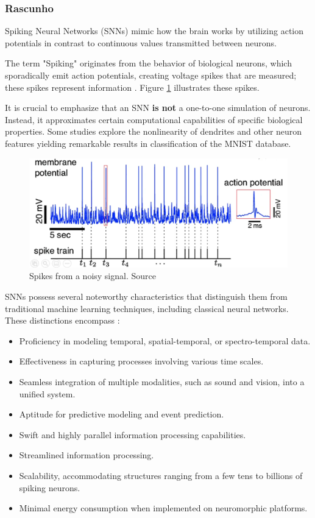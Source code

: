 \begin{frame}[allowframebreaks]
	\frametitle{Rascunho}
	\par Spiking Neural Networks (SNNs) mimic how the brain works by utilizing action potentials in contrast to continuous values transmitted between neurons.
	
	\par The term "Spiking" originates from the behavior of biological neurons, which sporadically emit action potentials, creating voltage spikes that are measured; these spikes represent information \cite{kasabov2019time}. Figure \ref{fig:neuronspikes} illustrates these spikes.
	
	\par It is crucial to emphasize that an SNN \textbf{is not} a one-to-one simulation of neurons. Instead, it approximates certain computational capabilities of specific biological properties. Some studies explore the nonlinearity of dendrites and other neuron features \cite{jones2020single} yielding remarkable results in classification of the MNIST database.
	
	\begin{figure}
		\centering
		\includegraphics[width=0.6\linewidth]{images/neuronSpikes}
		\caption{Spikes from a noisy signal. Source \cite{dan_goodman_2022_7044500}}
		\label{fig:neuronspikes}
	\end{figure}
	
	\par SNNs possess several noteworthy characteristics that distinguish them from traditional machine learning techniques, including classical neural networks. These distinctions encompass \cite{kasabov2019time}:
	
	\begin{itemize}
		\item Proficiency in modeling temporal, spatial-temporal, or spectro-temporal data.
		\item Effectiveness in capturing processes involving various time scales.
		\item Seamless integration of multiple modalities, such as sound and vision, into a unified system.
		\item Aptitude for predictive modeling and event prediction.
		\item Swift and highly parallel information processing capabilities.
		\item Streamlined information processing.
		\item Scalability, accommodating structures ranging from a few tens to billions of spiking neurons.
		\item Minimal energy consumption when implemented on neuromorphic platforms.
	\end{itemize}
	

\end{frame}
